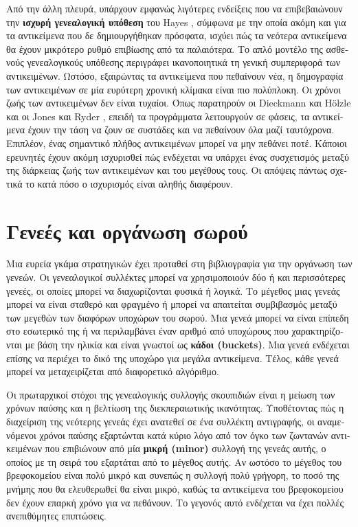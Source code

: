 \begin{greek}
Από την άλλη πλευρά, υπάρχουν εμφανώς λιγότερες ενδείξεις
που να επιβεβαιώνουν την \textbf{ισχυρή γενεαλογική υπόθεση}
του Hayes \cite{DBLP:conf/oopsla/Hayes91}, σύμφωνα με την
οποία ακόμη και για τα αντικείμενα που δε δημιουργήθηκαν
πρόσφατα, ισχύει πώς τα νεότερα αντικείμενα θα έχουν μικρότερο
ρυθμό επιβίωσης από τα παλαιότερα. Το απλό μοντέλο της ασθενούς
γενεαλογικούς υπόθεσης περιγράφει ικανοποιητικά τη γενική
συμπεριφορά των αντικειμένων. Ωστόσο, εξαιρώντας τα αντικείμενα
που πεθαίνουν νέα, η δημογραφία των αντικειμένων σε μία
ευρύτερη χρονική κλίμακα είναι πιο πολύπλοκη. Οι χρόνοι
ζωής των αντικειμένων δεν είναι τυχαίοι. Όπως παρατηρούν
οι Dieckmann και H{\"o}lzle \cite{DBLP:conf/ecoop/DieckmannH99}
και οι Jones και Ryder \cite{DBLP:conf/iwmm/JonesR08}, επειδή
τα προγράμματα λειτουργούν σε φάσεις, τα αντικείμενα έχουν
την τάση να ζουν σε συστάδες και να πεθαίνουν όλα μαζί
ταυτόχρονα. Επιπλέον, ένας σημαντικό πλήθος αντικειμένων μπορεί
να μην πεθάνει ποτέ. Κάποιοι ερευνητές έχουν ακόμη ισχυρισθεί
πώς ενδέχεται να υπάρχει ένας συσχετισμός μεταξύ της διάρκειας
ζωής των αντικειμένων και του μεγέθους τους. Οι απόψεις πάντως
\cite{DBLP:conf/oopsla/CaudillW86, DBLP:conf/oopsla/UngarJ88,
DBLP:conf/pldi/BarrettZ93} σχετικά το κατά πόσο ο ισχυρισμός
είναι αληθής διαφέρουν.

\section{Γενεές και οργάνωση σωρού}
Μια ευρεία γκάμα στρατηγικών έχει προταθεί στη βιβλιογραφία για την οργάνωση των
γενεών. Οι γενεαλογικοί συλλέκτες μπορεί να χρησιμοποιούν δύο ή και περισσότερες
γενεές, οι οποίες μπορεί να διαχωρίζονται φυσικά ή λογικά. Το μέγεθος μιας γενεάς
μπορεί να είναι σταθερό και φραγμένο ή μπορεί να απαιτείται συμβιβασμός μεταξύ των 
μεγεθών των διαφόρων υποχώρων του σωρού. Μια γενεά μπορεί να είναι επίπεδη στο
εσωτερικό της ή να περιλαμβάνει έναν αριθμό από υποχώρους που χαρακτηρίζονται
με βάση την ηλικία και είναι γνωστοί ως \textbf{κάδοι (buckets)}. Μια γενεά ενδέχεται
επίσης να περιέχει το δικό της υποχώρο για μεγάλα αντικείμενα. Τέλος, κάθε γενεά
μπορεί να μεταχειρίζεται από διαφορετικό αλγόριθμο.

Οι πρωταρχικοί στόχοι της γενεαλογικής συλλογής σκουπιδιών είναι η μείωση των
χρόνων παύσης και η βελτίωση της διεκπεραιωτικής ικανότητας. Υποθέτοντας πώς η
διαχείριση της νεότερης γενεάς έχει ανατεθεί σε ένα συλλέκτη αντιγραφής, οι αναμενόμενοι
χρόνοι παύσης εξαρτώνται κατά κύριο λόγο από τον όγκο των ζωντανών αντικειμένων
που επιβιώνουν από μία \textbf{μικρή (minor)} συλλογή της γενεάς αυτής, ο οποίος
με τη σειρά του εξαρτάται από το μέγεθος αυτής. Αν ωστόσο το μέγεθος του βρεφοκομείου
είναι πολύ μικρό και συνεπώς η συλλογή πολύ γρήγορη, το ποσό της μνήμης που θα 
ελευθερωθεί θα είναι μικρό, καθώς τα αντικείμενα του βρεφοκομείου δεν έχουν
επαρκή χρόνο για να πεθάνουν. Το γεγονός αυτό ενδέχεται να έχει πολλές ανεπιθύμητες
επιπτώσεις. 


\end{greek}
